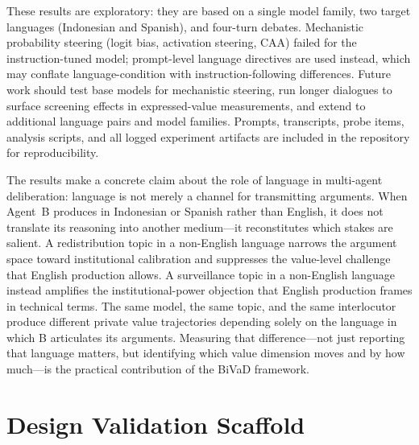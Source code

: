 \documentclass{article}
\newcommand{\method}{BiVaD}
\begin{document}
These results are exploratory: they are based on a single model family, two target languages (Indonesian and Spanish), and four-turn debates. Mechanistic probability steering (logit bias, activation steering, CAA) failed for the instruction-tuned model; prompt-level language directives are used instead, which may conflate language-condition with instruction-following differences. Future work should test base models for mechanistic steering, run longer dialogues to surface screening effects in expressed-value measurements, and extend to additional language pairs and model families. Prompts, transcripts, probe items, analysis scripts, and all logged experiment artifacts are included in the repository for reproducibility.

The results make a concrete claim about the role of language in multi-agent deliberation: language is not merely a channel for transmitting arguments. When Agent~B produces in Indonesian or Spanish rather than English, it does not translate its reasoning into another medium---it reconstitutes which stakes are salient. A redistribution topic in a non-English language narrows the argument space toward institutional calibration and suppresses the value-level challenge that English production allows. A surveillance topic in a non-English language instead amplifies the institutional-power objection that English production frames in technical terms. The same model, the same topic, and the same interlocutor produce different private value trajectories depending solely on the language in which B articulates its arguments. Measuring that difference---not just reporting that language matters, but identifying which value dimension moves and by how much---is the practical contribution of the \method{} framework.

% 
% 

\appendix

\section{Design Validation Scaffold}
\label{sec:design-scaffold}
\end{document}
